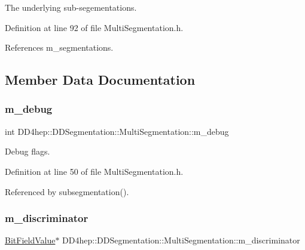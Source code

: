 The underlying sub-\/segementations. 



Definition at line 92 of file Multi\+Segmentation.\+h.



References m\+\_\+segmentations.



\subsection{Member Data Documentation}
\hypertarget{class_d_d4hep_1_1_d_d_segmentation_1_1_multi_segmentation_aa78b5218bf4246b81cf5e74a1233184c}{}\label{class_d_d4hep_1_1_d_d_segmentation_1_1_multi_segmentation_aa78b5218bf4246b81cf5e74a1233184c} 
\subsubsection{\texorpdfstring{m\+\_\+debug}{m\_debug}}
{\footnotesize\ttfamily int D\+D4hep\+::\+D\+D\+Segmentation\+::\+Multi\+Segmentation\+::m\+\_\+debug\hspace{0.3cm}{\ttfamily [protected]}}



Debug flags. 



Definition at line 50 of file Multi\+Segmentation.\+h.



Referenced by subsegmentation().

\hypertarget{class_d_d4hep_1_1_d_d_segmentation_1_1_multi_segmentation_a5d86769ef20468667fbc44fc6d8b2a4e}{}\label{class_d_d4hep_1_1_d_d_segmentation_1_1_multi_segmentation_a5d86769ef20468667fbc44fc6d8b2a4e} 
\subsubsection{\texorpdfstring{m\+\_\+discriminator}{m\_discriminator}}
{\footnotesize\ttfamily \hyperlink{class_d_d4hep_1_1_d_d_segmentation_1_1_bit_field_value}{Bit\+Field\+Value}$\ast$ D\+D4hep\+::\+D\+D\+Segmentation\+::\+Multi\+Segmentation\+::m\+\_\+discriminator\hspace{0.3cm}{\ttfamily [protected]}}



